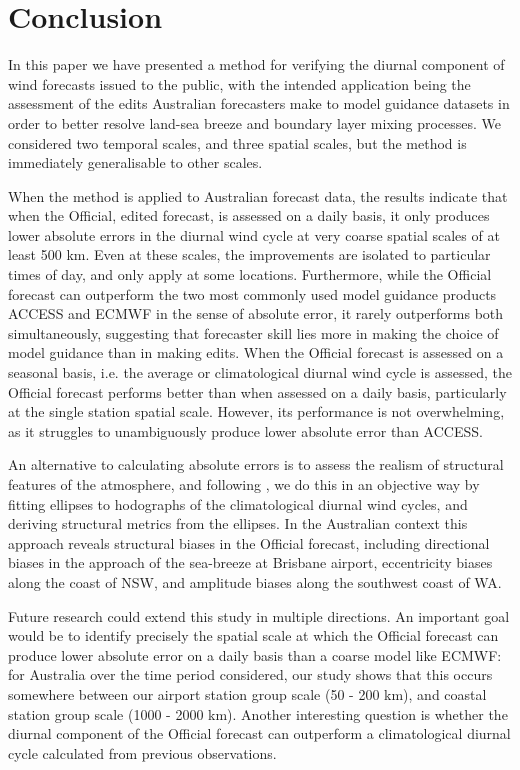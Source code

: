 \documentclass[twocol]{ametsoc}
\begin{document}
\section{Conclusion}
\label{Sec:Conclusion}
In this paper we have presented a method for verifying the diurnal component of wind forecasts issued to the public, with the intended application being the assessment of the edits Australian forecasters make to model guidance datasets in order to better resolve land-sea breeze and boundary layer mixing processes. We considered two temporal scales, and three spatial scales, but the method is immediately generalisable to other scales. 

When the method is applied to Australian forecast data, the results indicate that when the Official, edited forecast, is assessed on a daily basis, it only produces lower absolute errors in the diurnal wind cycle at very coarse spatial scales of at least 500 km. Even at these scales, the improvements are isolated to particular times of day, and only apply at some locations. Furthermore, while the Official forecast can outperform the two most commonly used model guidance products ACCESS and ECMWF in the sense of absolute error, it rarely outperforms both simultaneously, suggesting that forecaster skill lies more in making the choice of model guidance than in making edits. When the Official forecast is assessed on a seasonal basis, i.e. the average or climatological diurnal wind cycle is assessed, the Official forecast performs better than when assessed on a daily basis, particularly at the single station spatial scale. However, its performance is not overwhelming, as it struggles to unambiguously produce lower absolute error than ACCESS. 

An alternative to calculating absolute errors is to assess the realism of structural features of the atmosphere, and following \citet{gille05}, we do this in an objective way by fitting ellipses to hodographs of the climatological diurnal wind cycles, and deriving structural metrics from the ellipses. In the Australian context this approach reveals structural biases in the Official forecast, including directional biases in the approach of the sea-breeze at Brisbane airport, eccentricity biases along the coast of NSW, and amplitude biases along the southwest coast of WA.  

Future research could extend this study in multiple directions. An important goal would be to identify precisely the spatial scale at which the Official forecast can produce lower absolute error on a daily basis than a coarse model like ECMWF: for Australia over the time period considered, our study shows that this occurs somewhere between our airport station group scale (50 - 200 km), and coastal station group scale (1000 - 2000 km). Another interesting question is whether the diurnal component of the Official forecast can outperform a climatological diurnal cycle calculated from previous observations. 
\end{document}
